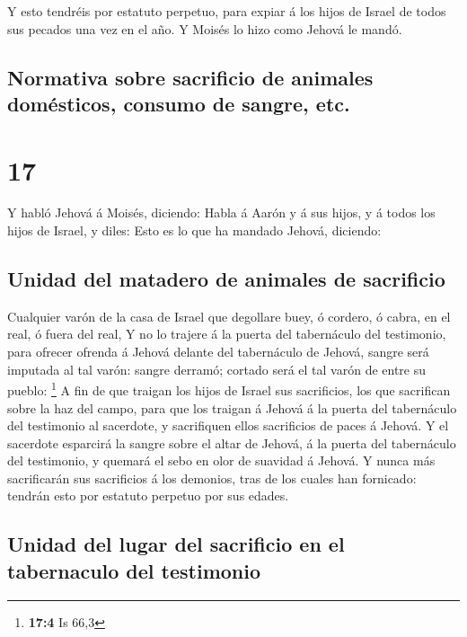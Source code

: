  Y esto tendréis por estatuto perpetuo, para expiar á los
hijos de Israel de todos sus pecados una vez en el año. Y Moisés lo hizo
como Jehová le mandó.

\hypertarget{normativa-sobre-sacrificio-de-animales-domuxe9sticos-consumo-de-sangre-etc.}{%
\subsection{Normativa sobre sacrificio de animales domésticos, consumo
de sangre,
etc.}\label{normativa-sobre-sacrificio-de-animales-domuxe9sticos-consumo-de-sangre-etc.}}

\hypertarget{section-16}{%
\section{17}\label{section-16}}

 Y habló Jehová á Moisés, diciendo:  Habla á
Aarón y á sus hijos, y á todos los hijos de Israel, y diles: Esto es lo
que ha mandado Jehová, diciendo:

\hypertarget{unidad-del-matadero-de-animales-de-sacrificio}{%
\subsection{Unidad del matadero de animales de
sacrificio}\label{unidad-del-matadero-de-animales-de-sacrificio}}

 Cualquier varón de la casa de Israel que degollare buey, ó
cordero, ó cabra, en el real, ó fuera del real,  Y no lo
trajere á la puerta del tabernáculo del testimonio, para ofrecer ofrenda
á Jehová delante del tabernáculo de Jehová, sangre será imputada al tal
varón: sangre derramó; cortado será el tal varón de entre su pueblo:
\footnote{\textbf{17:4} Is 66,3}  A fin de que traigan los
hijos de Israel sus sacrificios, los que sacrifican sobre la haz del
campo, para que los traigan á Jehová á la puerta del tabernáculo del
testimonio al sacerdote, y sacrifiquen ellos sacrificios de paces á
Jehová.  Y el sacerdote esparcirá la sangre sobre el altar
de Jehová, á la puerta del tabernáculo del testimonio, y quemará el sebo
en olor de suavidad á Jehová.  Y nunca más sacrificarán sus
sacrificios á los demonios, tras de los cuales han fornicado: tendrán
esto por estatuto perpetuo por sus edades.

\hypertarget{unidad-del-lugar-del-sacrificio-en-el-tabernaculo-del-testimonio}{%
\subsection{Unidad del lugar del sacrificio en el tabernaculo del
testimonio}\label{unidad-del-lugar-del-sacrificio-en-el-tabernaculo-del-testimonio}}

